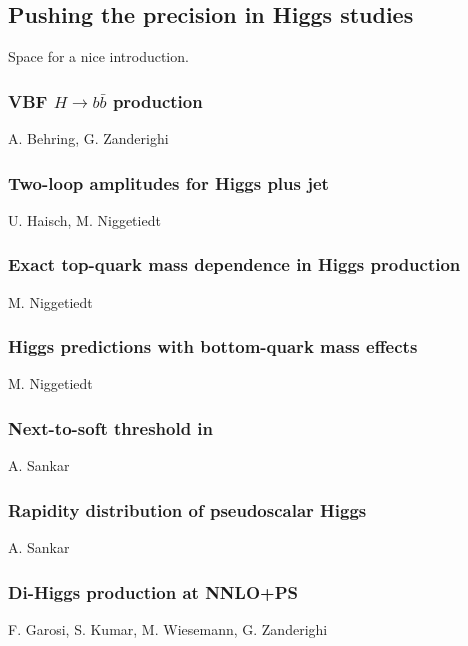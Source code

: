 \documentclass{FBR_Bericht_2025}
\begin{document}
\subsection[Pushing the precision in Higgs studies]{Pushing the precision in Higgs studies}
\begin{refsection}
Space for a nice introduction.
%
\subsubsection{VBF $H\rightarrow b\bar{b}$ production}
\begin{Namen}
A. Behring, G. Zanderighi
\end{Namen}
%
\subsubsection{Two-loop amplitudes for Higgs plus jet}
\begin{Namen}
U. Haisch, M. Niggetiedt
\end{Namen}
%
\subsubsection{Exact top-quark mass dependence in Higgs production}
\begin{Namen}
M. Niggetiedt
\end{Namen}
%
\subsubsection{Higgs predictions with bottom-quark mass effects}
\begin{Namen}
M. Niggetiedt
\end{Namen}
%
\subsubsection{Next-to-soft threshold in \bbH{}}
\begin{Namen}
A. Sankar
\end{Namen}
%
\subsubsection{Rapidity distribution of pseudoscalar Higgs}
\begin{Namen}
A. Sankar
\end{Namen}
%
\subsubsection{Di-Higgs production at NNLO+PS}
\begin{Namen}
F. Garosi, S. Kumar, M. Wiesemann, G. Zanderighi
\end{Namen}
%
\printbibliography[heading=subbibliography]
\end{refsection}
\end{document}
